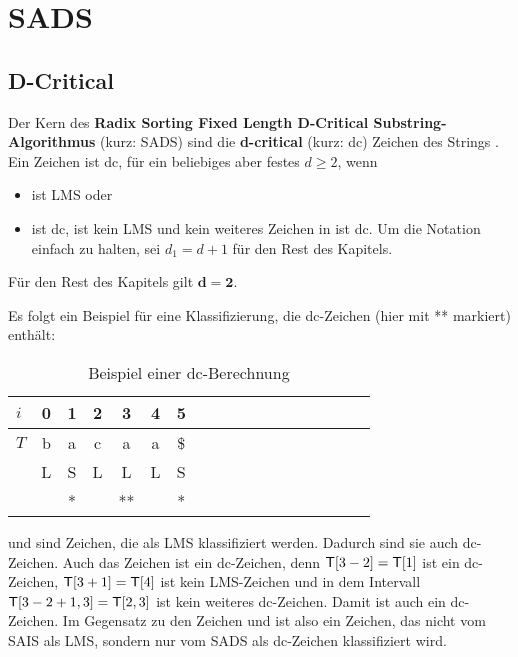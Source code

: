 \section{SADS}
\subsection{D-Critical}
\label{dc}


Der  Kern des \textbf{Radix Sorting Fixed Length D-Critical Substring-Algo\-rithmus}\cite[Kap.~4]{saca:6} (kurz: SADS) sind die \textbf{d-critical} (kurz: dc) Zeichen des Strings . Ein Zeichen ist dc, für ein beliebiges aber festes $d \geq 2$, wenn
\begin{itemize}
    \item {} ist LMS oder
    \item {} ist dc,  ist kein LMS und kein weiteres Zeichen in  ist dc. Um die Notation einfach zu halten, sei $d_1=d+1$ für den Rest des Kapitels.
\end{itemize}

\noindent Für den Rest des Kapitels gilt $\mathbf{d=2}$.

Es folgt ein Beispiel für eine Klassifizierung, die dc-Zeichen (hier mit ** markiert) enthält:

\begin{table}[H]
\centering
  \begin{tabular}{ | l | c | c| c| c| c| c| c| c| c| c| c| c| c| c| c| c| c | }
    \hline
        $i$ & 0 & 1 & 2 & 3 & 4 & 5 \\ \hline
        $T$ & b & a & c & a & a & \$ \\ \hline
        $ $ & L & S & L & L & L & S \\ \hline
      	$ $ & & * & & ** & & * \\
    \hline
  \end{tabular}
  \caption{Beispiel einer dc-Berechnung}
\end{table}
\bigskip

\noindent {} und  sind Zeichen, die als LMS klassifiziert werden. Dadurch sind sie auch dc-Zeichen. Auch das Zeichen  ist ein dc-Zeichen, denn $\inputtext[3 - 2] = \inputtext[1]$ ist ein dc-Zeichen, $\inputtext[3 + 1] = \inputtext[4]$ ist kein LMS-Zeichen und in dem Intervall $\inputtext[3-2+1,3] = \inputtext[2,3]$ ist kein weiteres dc-Zeichen. Damit ist  auch ein dc-Zeichen. Im Gegensatz zu den Zeichen  und  ist  also ein Zeichen, das nicht vom SAIS als LMS, sondern nur vom SADS als dc-Zeichen klassifiziert wird.

